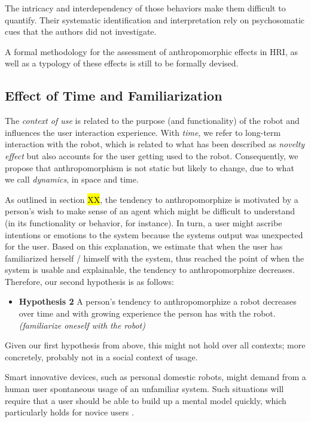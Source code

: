 \documentclass{frontiersSCNS} %
\begin{document}
The intricacy and interdependency of those behaviors make them difficult to
quantify.  Their systematic identification and interpretation rely on
psychosomatic cues that the authors did not investigate.

A formal methodology for the assessment of anthropomorphic effects in HRI, as
well as a typology of these effects is still to be formally devised.

\subsection*{Effect of Time and Familiarization}

The \textit{context of use} is related to the purpose (and functionality) of the
robot and influences the user interaction experience. With \textit{time}, we
refer to long-term interaction with the robot, which is related to what has been
described as \textit{novelty effect} but also accounts for the user getting used
to the robot. Consequently, we propose that anthropomorphism is not static but
likely to change, due to what we call \textit{dynamics}, in space and time.


As outlined in section \hl{XX}, the tendency to anthropomorphize is motivated by
a person's wish to make sense of an agent which might be difficult to understand
(in its functionality or behavior, for instance). In turn, a user might ascribe
intentions or emotions to the system because the systems output was unexpected
for the user. Based on this explanation, we estimate that when the user has
familiarized herself / himself with the system, thus reached the point of when
the system is usable and explainable, the tendency to anthropomorphize
decreases. Therefore, our second hypothesis is as follows: 

\begin{itemize}
	\item \textbf{Hypothesis 2} A person's tendency to anthropomorphize a robot decreases over time and with growing experience the person has with the robot. \textit{(familiarize oneself with the robot)}
\end{itemize}	
	

Given our first hypothesis from above, this might not hold over all contexts;
more concretely, probably not in a social context of usage.


Smart innovative devices, such as personal domestic robots, might demand from a
human user spontaneous usage of an unfamiliar system. Such situations will
require that a user should be able to build up a mental model quickly, which
particularly holds for novice users \cite{schmitz_concepts_2011}.
\end{document}
